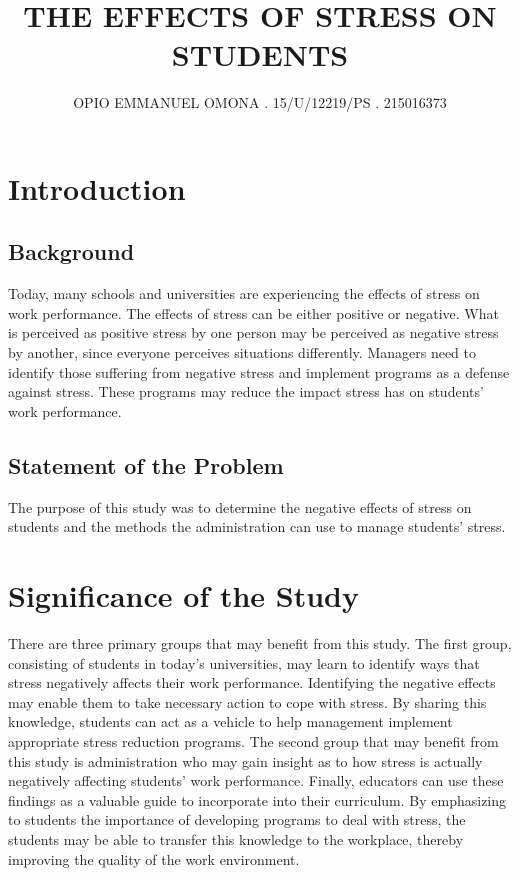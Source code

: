 \documentclass{article}
\begin{document}
\title {THE EFFECTS OF STRESS ON STUDENTS}
\author{OPIO EMMANUEL OMONA . 15/U/12219/PS . 215016373}
\maketitle
\section{Introduction}
\subsection{Background}
Today, many schools and universities are experiencing the effects of stress on
work performance. The effects of stress can be either positive or negative. What is
perceived as positive stress by one person may be perceived as negative stress by
another, since everyone perceives situations differently. Managers need to identify those
suffering from negative stress and implement programs as a defense against stress.
These programs may reduce the impact stress has on students’ work performance. 

\subsection{Statement of the Problem}
The purpose of this study was to determine the negative effects of stress on students
and the methods the administration can use to manage students’ stress.

\section{Significance of the Study}
There are three primary groups that may benefit from this study. The first group,
consisting of students in today's universities, may learn to identify ways
that stress negatively affects their work performance. Identifying the negative effects
may enable them to take necessary action to cope with stress. By sharing this
knowledge, students can act as a vehicle to help management implement appropriate
stress reduction programs.  The second group that may benefit from this study is
administration who may gain insight as to how stress is actually negatively affecting students’ work performance. Finally, educators can use these findings as a valuable
guide to incorporate into their curriculum. By emphasizing to students the importance
of developing programs to deal with stress, the students may be able to transfer this
knowledge to the workplace, thereby improving the quality of the work environment.
\end{document}

